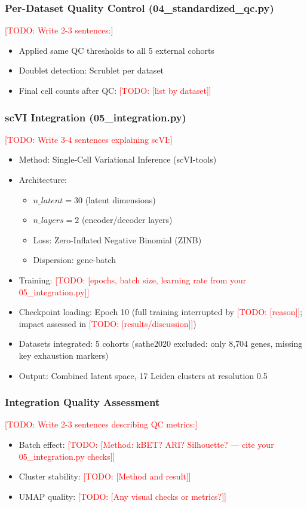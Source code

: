 \documentclass[12pt,oneside]{article}
\newcommand{\TODO}[1]{\textcolor{red}{[TODO: #1]}}
\begin{document}
\subsubsection{Per-Dataset Quality Control (04\_standardized\_qc.py)}
\TODO{Write 2-3 sentences:}
\begin{itemize}
    \item Applied same QC thresholds to all 5 external cohorts
    \item Doublet detection: Scrublet per dataset
    \item Final cell counts after QC: \TODO{[list by dataset]}
\end{itemize}

\subsubsection{scVI Integration (05\_integration.py)}
\TODO{Write 3-4 sentences explaining scVI:}
\begin{itemize}
    \item Method: Single-Cell Variational Inference (scVI-tools)
    \item Architecture:
    \begin{itemize}
        \item $n\_latent = 30$ (latent dimensions)
        \item $n\_layers = 2$ (encoder/decoder layers)
        \item Loss: Zero-Inflated Negative Binomial (ZINB)
        \item Dispersion: gene-batch
    \end{itemize}
    \item Training: \TODO{[epochs, batch size, learning rate from your 05_integration.py]}
    \item Checkpoint loading: Epoch 10 (full training interrupted by \TODO{[reason]}; impact assessed in \TODO{[results/discussion]})
    \item Datasets integrated: 5 cohorts (sathe2020 excluded: only 8,704 genes, missing key exhaustion markers)
    \item Output: Combined latent space, 17 Leiden clusters at resolution 0.5
\end{itemize}

\subsubsection{Integration Quality Assessment}
\TODO{Write 2-3 sentences describing QC metrics:}
\begin{itemize}
    \item Batch effect: \TODO{[Method: kBET? ARI? Silhouette? — cite your 05_integration.py checks]}
    \item Cluster stability: \TODO{[Method and result]}
    \item UMAP quality: \TODO{[Any visual checks or metrics?]}
\end{itemize}
\end{document}
